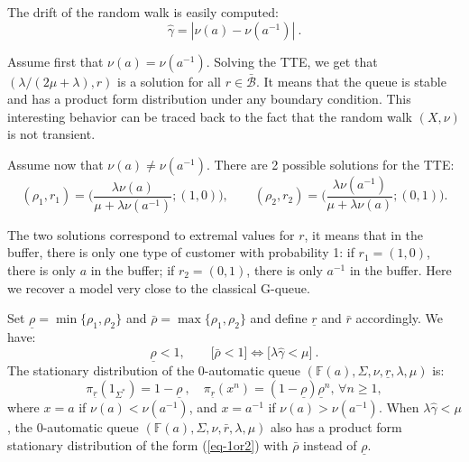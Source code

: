 \documentclass[11pt,a4paper]{article}
\theoremstyle{remark}
\def\Blackboardfont{\mathbb}
\def\closcb{\bar{\cB}}
\def\F{{\Blackboardfont F}}
\def\cB{{\mathcal B}}
\def\iff{\Longleftrightarrow}
\def\eref#1{(\ref{#1})}
\begin{document}
The drift of the random walk is easily computed:
\[
\widehat{\gamma} = | \nu(a) - \nu(a^{-1}) | \:.
\]

Assume first that $\nu(a)=\nu(a^{-1})$. Solving the TTE, we get
that $(\lambda/(2\mu+\lambda),r)$ is a solution for all $r \in
\closcb$. It means that the queue is stable and has a product form
distribution under any boundary condition. This interesting
behavior can be traced back to the fact that the random walk
$(X,\nu)$ is not transient.

\medskip

Assume now that $\nu(a)\neq\nu(a^{-1})$. There are 2 possible
solutions for the TTE:
\begin{equation}\label{eq-TTE-Z-1}
(\rho_1,r_1)=\bigg(
  \frac{\lambda\nu(a)}{\mu+\lambda\nu(a^{-1})};(1,0)\bigg), \qquad
(\rho_2,r_2)=\bigg(\frac{\lambda\nu(a^{-1})}{\mu+\lambda\nu(a)};(0,1)\bigg).
\end{equation}

The two solutions correspond to extremal values for $r$, it means
that in the buffer, there is only one type of customer with
probability 1: if $r_1=(1,0)$, there is only $a$ in the buffer;
if $r_2=(0,1)$, there is only $a^{-1}$ in the buffer. Here we
recover a model very close to the classical G-queue.

Set $\underline{\rho} = \min \{\rho_1,\rho_2 \}$ and $\bar{\rho}
= \max \{\rho_1,\rho_2 \}$ and define $\underline{r}$ and
$\bar{r}$ accordingly. We have:
\[
\underline{\rho} < 1, \qquad \bigl[ \bar{\rho} < 1 \bigr] \iff
\bigl[ \lambda \widehat{\gamma} < \mu \bigr] \:.
\]
The stationary distribution of the 0-automatic queue $(\F(a), \Sigma,
\nu, \underline{r},\lambda,\mu)$ is:
\begin{equation}\label{eq-1or2}
\pi_{\underline{r}} (1_{\Sigma^*})=1-\underline{\rho}\:, \quad
\pi_{\underline{r}}(x^n)=(1-\underline{\rho})\underline{\rho}^n \mbox{
  , }
\forall n\geq1,
\end{equation}
where $x=a$ if $\nu(a)< \nu(a^{-1})$, and $x=a^{-1}$ if $\nu(a) >
\nu(a^{-1})$.
When $\lambda \widehat{\gamma} < \mu$, the 0-automatic queue $(\F(a), \Sigma,
\nu, \bar{r},\lambda,\mu)$ also has a product form stationary
distribution of the form \eref{eq-1or2} with $\bar{\rho}$ instead of
$\underline{\rho}$.

\medskip
\end{document}
